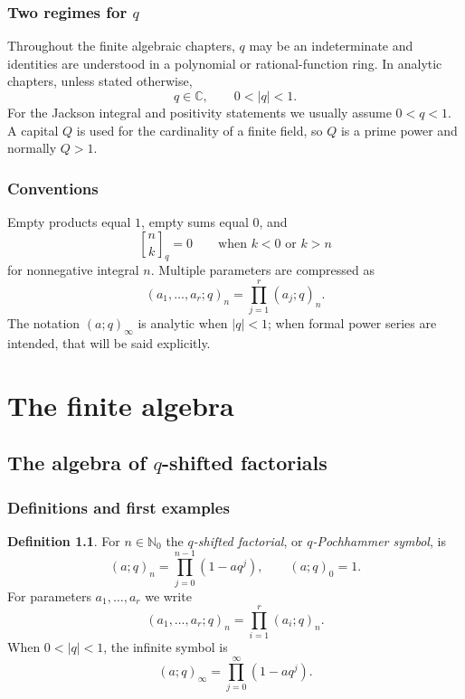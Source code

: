 \documentclass[11pt,oneside,openany]{book}
\theoremstyle{definition}
\newtheorem{definition}[theorem]{Definition}
\theoremstyle{remark}
\newcommand{\qbinom}[2]{\genfrac{[}{]}{0pt}{}{#1}{#2}_{q}}
\newcommand{\C}{\mathbb C}
\newcommand{\N}{\mathbb N}
\newcommand{\abs}[1]{\lvert #1\rvert}
\begin{document}
\section*{Two regimes for $q$}
Throughout the finite algebraic chapters, $q$ may be an indeterminate and identities are understood in a polynomial or rational-function ring.  In analytic chapters, unless stated otherwise,
\[
  q\in\C,\qquad 0<\abs q<1.
\]
For the Jackson integral and positivity statements we usually assume $0<q<1$.  A capital $Q$ is used for the cardinality of a finite field, so $Q$ is a prime power and normally $Q>1$.

\section*{Conventions}
Empty products equal $1$, empty sums equal $0$, and
\[
 \qbinom nk=0\qquad\text{when }k<0\text{ or }k>n
\]
for nonnegative integral $n$.  Multiple parameters are compressed as
\[
 (a_1,\ldots,a_r;q)_n=\prod_{j=1}^r(a_j;q)_n.
\]
The notation $(a;q)_\infty$ is analytic when $\abs q<1$; when formal power series are intended, that will be said explicitly.

\tableofcontents

\mainmatter

\part{The finite algebra}

\chapter{The algebra of \texorpdfstring{$q$}{q}-shifted factorials}\label{chap:pochhammer}

\section{Definitions and first examples}

\begin{definition}
For $n\in\N_0$ the \emph{$q$-shifted factorial}, or \emph{$q$-Pochhammer symbol}, is
\[
 (a;q)_n=\prod_{j=0}^{n-1}(1-aq^j),\qquad (a;q)_0=1.
\]
For parameters $a_1,\dots,a_r$ we write
\[
 (a_1,\dots,a_r;q)_n=\prod_{i=1}^r(a_i;q)_n.
\]
When $0<\abs q<1$, the infinite symbol is
\[
 (a;q)_\infty=\prod_{j=0}^{\infty}(1-aq^j).
\]
\end{definition}
\end{document}
